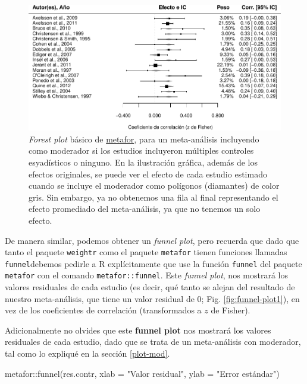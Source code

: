 \documentclass[
  bookmarksnumbered]{article}
\newenvironment{Shaded}{\begin{snugshade}}{\end{snugshade}}
\newcommand{\AttributeTok}[1]{\textcolor[rgb]{0.00,0.34,0.68}{#1}}
\newcommand{\FunctionTok}[1]{\textcolor[rgb]{0.39,0.29,0.61}{#1}}
\newcommand{\NormalTok}[1]{\textcolor[rgb]{0.12,0.11,0.11}{#1}}
\newcommand{\SpecialCharTok}[1]{\textcolor[rgb]{0.24,0.68,0.91}{#1}}
\newcommand{\StringTok}[1]{\textcolor[rgb]{0.75,0.01,0.01}{#1}}
\begin{document}
\begin{figure}
\centering
\includegraphics{Meta-analysis_files/figure-latex/for-plot-mod2-1.pdf}
\caption{\label{fig:for-plot-mod2}\emph{Forest plot} básico de \href{https://www.metafor-project.org/doku.php}{metafor}, para un meta-análisis incluyendo como moderador si los estudios incluyeron múltiples controles esyadísticos o ninguno. En la ilustración gráfica, además de los efectos originales, se puede ver el efecto de cada estudio estimado cuando se incluye el moderador como polígonos (diamantes) de color gris. Sin embargo, ya no obtenemos una fila al final representando el efecto promediado del meta-análisis, ya que no tenemos un solo efecto.}
\end{figure}

De manera similar, podemos obtener un \emph{funnel plot}, pero recuerda que dado que tanto el paquete \texttt{weightr} como el paquete \texttt{metafor} tienen funciones llamadas \texttt{funnel}debemos pedirle a R explícitamente que use la función \texttt{funnel} del paquete \texttt{metafor} con el comando \texttt{metafor::funnel}.
Este \emph{funnel plot}, nos mostrará los valores residuales de cada estudio (es decir, qué tanto se alejan del resultado de nuestro meta-análisis, que tiene un valor residual de 0; Fig. \ref{fig:funnel-plot1}), en vez de los coeficientes de correlación (transformados a \(z\) de Fisher).

Adicionalmente no olvides que este \textbf{funnel plot} nos mostrará los valores residuales de cada estudio, dado que se trata de un meta-análisis con moderador, tal como lo expliqué en la sección \ref{plot-mod}.

\begin{Shaded}
\begin{Highlighting}[]
\NormalTok{metafor}\SpecialCharTok{::}\FunctionTok{funnel}\NormalTok{(res.contr,}
                \AttributeTok{xlab =} \StringTok{"Valor residual"}\NormalTok{,}
                \AttributeTok{ylab =} \StringTok{"Error estándar"}\NormalTok{)}
\end{Highlighting}
\end{Shaded}
\end{document}
